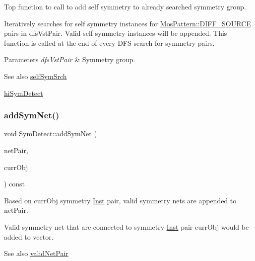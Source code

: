Top function to call to add self symmetry to already searched symmetry group. 

Iteratively searches for self symmetry instances for \hyperlink{type_8h_af19eddb079bfea723256710b029c38e8ad45b64a7d6b85dde1b52dd5a18863933}{Mos\+Pattern\+::\+D\+I\+F\+F\+\_\+\+S\+O\+U\+R\+CE} pairs in dfs\+Vst\+Pair. Valid self symmetry instances will be appended. This function is called at the end of every D\+FS search for symmetry pairs.


\begin{DoxyParams}{Parameters}
{\em dfs\+Vst\+Pair} & Symmetry group.\\
\hline
\end{DoxyParams}
\begin{DoxySeeAlso}{See also}
\hyperlink{classSymDetect_ab6f286024b013fa257295111016da18b}{self\+Sym\+Srch} 

\hyperlink{classSymDetect_a961c1dec1cb00000c9ed107dedac50ec}{hi\+Sym\+Detect} 
\end{DoxySeeAlso}
\mbox{\label{classSymDetect_a3d47390c92f0bd31d1ab84f1a62d66e3}} 
\subsubsection{\texorpdfstring{add\+Sym\+Net()}{addSymNet()}}
{\footnotesize\ttfamily void Sym\+Detect\+::add\+Sym\+Net (\begin{DoxyParamCaption}\item[{std\+::vector$<$ \hyperlink{classNetPair}{Net\+Pair} $>$ \&}]{net\+Pair,  }\item[{\hyperlink{classMosPair}{Mos\+Pair} \&}]{curr\+Obj }\end{DoxyParamCaption}) const\hspace{0.3cm}{\ttfamily [private]}}



Based on curr\+Obj symmetry \hyperlink{classInst}{Inst} pair, valid symmetry nets are appended to net\+Pair. 

Valid symmetry net that are connected to symmetry \hyperlink{classInst}{Inst} pair curr\+Obj would be added to vector.

\begin{DoxySeeAlso}{See also}
\hyperlink{classSymDetect_aee09c40b5606443e8aa9f30865dab600}{valid\+Net\+Pair} 
\end{DoxySeeAlso}


